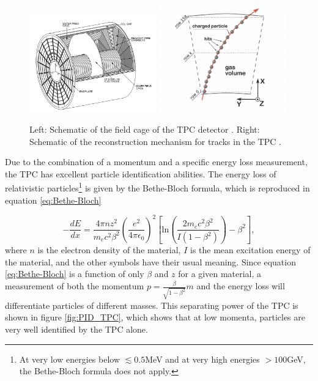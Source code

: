 \begin{figure}
    \centering
    \includegraphics[width=0.49\textwidth]{figures/tpc_cage.png}
    \includegraphics[width=0.49\textwidth]{figures/tpc_process.png}
    \caption{Left: Schematic of the field cage of the TPC detector \cite{TPC_figure}. Right: Schematic of the reconstruction mechanism for tracks in the TPC \cite{ALICE_TPC_trigger}.}
    \label{fig:TPC_schemtic}
\end{figure}

Due to the combination of a momentum and a specific energy loss measurement, the TPC has excellent particle identification abilities. The energy loss of relativistic particles\footnote{At very low energies below $\lesssim 0.5 $MeV and at very high energies $>100$GeV, the Bethe-Bloch formula does not apply. } is given by the Bethe-Bloch formula, which is reproduced in equation \ref{eq:Bethe-Bloch}

\begin{equation}\label{eq:Bethe-Bloch}
    -\frac{dE}{dx} = \frac{4\pi n z^2}{m_e c^2 \beta^2} \left( \frac{e^2}{4\pi \epsilon_0}\right)^2 \left[ \mathrm{ln}\left(\frac{2m_ec^2\beta^2}{I(1-\beta^2)}\right)-\beta^2 \right],
\end{equation}
where $n$ is the electron density of the material, $I$ is the mean excitation energy of the material, and the other symbols have their usual meaning. Since equation \ref{eq:Bethe-Bloch} is a function of only $\beta$ and $z$ for a given material, a measurement of both the momentum $p=\frac{\beta}{\sqrt{1-\beta^2}}m$ and the energy loss will differentiate particles of different masses. This separating power of the TPC is shown in figure \ref{fig:PID_TPC}, which shows that at low momenta, particles are very well identified by the TPC alone. \\

